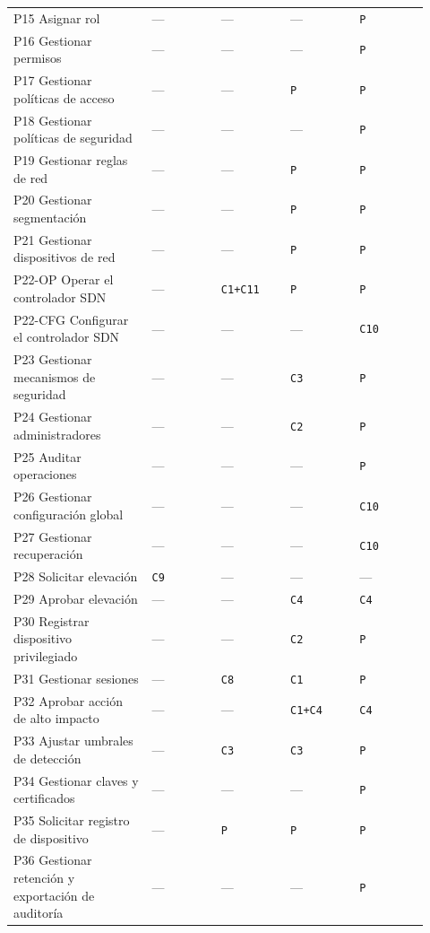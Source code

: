 \documentclass[11pt,a4paper]{report}
\begin{document}
\begin{longtable}{p{0.30\linewidth}p{0.155\linewidth}p{0.155\linewidth}p{0.155\linewidth}p{0.155\linewidth}}
P15 Asignar rol & --- & --- & --- & \texttt{P}\\
P16 Gestionar permisos & --- & --- & --- & \texttt{P}\\
P17 Gestionar políticas de acceso & --- & --- & \texttt{P} & \texttt{P}\\
P18 Gestionar políticas de seguridad & --- & --- & --- & \texttt{P}\\
P19 Gestionar reglas de red & --- & --- & \texttt{P} & \texttt{P}\\
P20 Gestionar segmentación & --- & --- & \texttt{P} & \texttt{P}\\
P21 Gestionar dispositivos de red & --- & --- & \texttt{P} & \texttt{P}\\
P22-OP Operar el controlador SDN & --- & \texttt{C1+C11} & \texttt{P} & \texttt{P}\\
P22-CFG Configurar el controlador SDN & --- & --- & --- & \texttt{C10}\\
P23 Gestionar mecanismos de seguridad & --- & --- & \texttt{C3} & \texttt{P}\\
P24 Gestionar administradores & --- & --- & \texttt{C2} & \texttt{P}\\
P25 Auditar operaciones & --- & --- & --- & \texttt{P}\\
P26 Gestionar configuración global & --- & --- & --- & \texttt{C10}\\
P27 Gestionar recuperación & --- & --- & --- & \texttt{C10}\\
P28 Solicitar elevación & \texttt{C9} & --- & --- & ---\\
P29 Aprobar elevación & --- & --- & \texttt{C4} & \texttt{C4}\\
P30 Registrar dispositivo privilegiado & --- & --- & \texttt{C2} & \texttt{P}\\
P31 Gestionar sesiones & --- & \texttt{C8} & \texttt{C1} & \texttt{P}\\
P32 Aprobar acción de alto impacto & --- & --- & \texttt{C1+C4} & \texttt{C4}\\
P33 Ajustar umbrales de detección & --- & \texttt{C3} & \texttt{C3} & \texttt{P}\\
P34 Gestionar claves y certificados & --- & --- & --- & \texttt{P}\\
P35 Solicitar registro de dispositivo & --- & \texttt{P} & \texttt{P} & \texttt{P}\\
P36 Gestionar retención y exportación de auditoría & --- & --- & --- & \texttt{P}\\
\bottomrule
\end{longtable}
\endgroup
\end{document}
